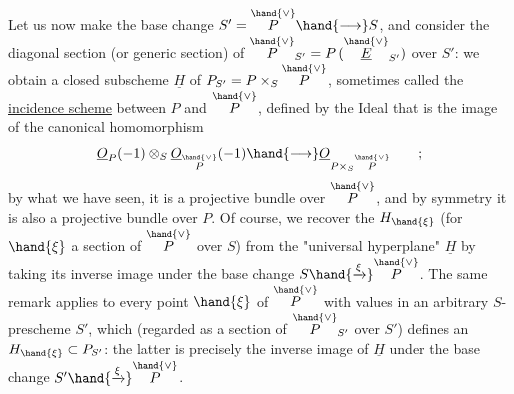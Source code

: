 
Let us now make the base change $S'=\overset{\hand{\vee}}{P}\hand{\longrightarrow} S$, and consider
the diagonal section (or generic section) of $\overset{\hand{\vee}}{P}_{S'} = P\,(\overset{\hand{\vee}}{\underline{E}}_{S'})$ over $S'$:
we obtain a closed subscheme $\underline{H}$ of $P_{S'} = P\times_S\overset{\hand{\vee}}{P}$, sometimes called the
\uline{incidence scheme} between $P$ and $\overset{\hand{\vee}}{P}$, defined by the Ideal that is the image of
the canonical homomorphism
\[ \underline{O}_P(-1)\otimes_S\underline{O}_{\overset{\hand{\vee}}{P}}(-1)\hand{\longrightarrow} \underline{O}_{P\times_S\overset{\hand{\vee}}{P}} \qquad ; \]
by what we have seen, it is a projective bundle over $\overset{\hand{\vee}}{P}$, and by
symmetry it is also a projective bundle over $P$. Of course, we
recover the  $H_{\hand{\xi}}$ (for $\hand{\xi}$ a section of $\overset{\hand{\vee}}{P}$ over $S$)\hand{,} from
the "universal hyperplane" $\underline{H}$\hand{,} by taking its inverse image under the base
change $S\hand{\xrightarrow{\xi}}\overset{\hand{\vee}}{P}$. The same remark applies to every point
$\hand{\xi}$ of $\overset{\hand{\vee}}{P}$ with values in an arbitrary $S$-prescheme $S'$, which (regarded as
a section of $\overset{\hand{\vee}}{P}_{S'}$ over $S'$) defines an $H_{\hand{\xi}}\subset P_{S'}$: the latter is
precisely the inverse image of $\underline{H}$ under the base change $S'\hand{\xrightarrow{\xi}}\overset{\hand{\vee}}{P}$.

